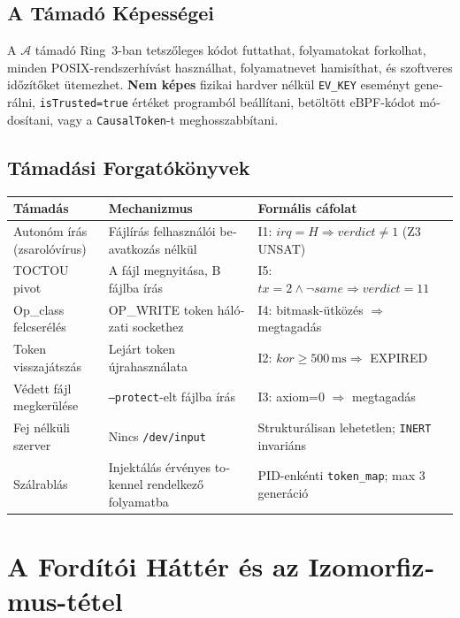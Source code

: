 \documentclass[11pt,a4paper,twoside]{article}
\begin{document}
\begin{magyar}
\subsection{A Támadó Képességei}

A $\mathcal{A}$ támadó Ring~3-ban tetszőleges kódot futtathat, folyamatokat
forkolhat, minden POSIX-rendszerhívást használhat, folyamatnevet hamisíthat,
és szoftveres időzítőket ütemezhet. \textbf{Nem képes} fizikai hardver nélkül
\texttt{EV\_KEY} eseményt generálni, \texttt{isTrusted=true} értéket
programból beállítani, betöltött eBPF-kódot módosítani, vagy a
\texttt{CausalToken}-t meghosszabbítani.

\subsection{Támadási Forgatókönyvek}

\begin{longtable}{@{}p{3.2cm}p{3.8cm}p{5.4cm}@{}}
\toprule
\textbf{Támadás} & \textbf{Mechanizmus} & \textbf{Formális cáfolat} \\
\midrule \endhead \bottomrule \endfoot
Autonóm írás (zsarolóvírus)
  & Fájlírás felhasználói beavatkozás nélkül
  & I1: $\mathit{irq}{=}H \Rightarrow \mathit{verdict}{\neq}1$ (Z3 UNSAT) \\[3pt]
TOCTOU pivot
  & A fájl megnyitása, B fájlba írás
  & I5: $\mathit{tx}{=}2 \wedge \neg\mathit{same} \Rightarrow \mathit{verdict}{=}11$ \\[3pt]
Op\_class felcserélés
  & OP\_WRITE token hálózati sockethez
  & I4: bitmask-ütközés $\Rightarrow$ megtagadás \\[3pt]
Token visszajátszás
  & Lejárt token újrahasználata
  & I2: $\mathit{kor}{\geq}500\,\mathrm{ms} \Rightarrow$ EXPIRED \\[3pt]
Védett fájl megkerülése
  & \texttt{--protect}-elt fájlba írás
  & I3: axiom=0 $\Rightarrow$ megtagadás \\[3pt]
Fej nélküli szerver
  & Nincs \texttt{/dev/input}
  & Strukturálisan lehetetlen; \texttt{INERT} invariáns \\[3pt]
Szálrablás
  & Injektálás érvényes tokennel rendelkező folyamatba
  & PID-enkénti \texttt{token\_map}; max 3 generáció \\
\end{longtable}

\section{A Fordítói Háttér és az Izomorfizmus-tétel}


\end{magyar}
\end{document}
